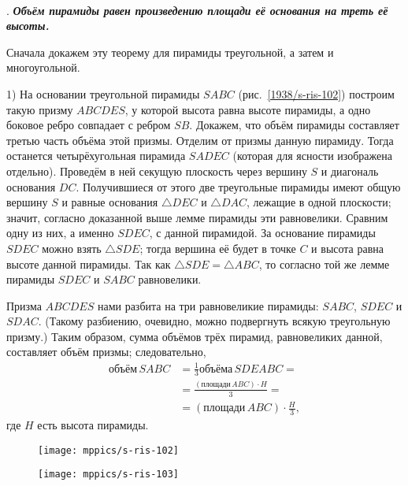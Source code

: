 \paragraph{}\label{1938/s91}
.
\textbf{\emph{Объём пирамиды равен произведению площади её основания на треть её высоты.}}

Сначала докажем эту теорему для пирамиды треугольной, а затем и многоугольной.

1) На основании треугольной пирамиды $SABC$ (рис.~\ref{1938/s-ris-102}) построим такую призму $ABCDES$, у которой высота равна высоте пирамиды, а одно боковое ребро совпадает с ребром $SB$.
Докажем, что объём пирамиды составляет третью часть объёма этой призмы.
Отделим от призмы данную пирамиду.
Тогда останется четырёхугольная пирамида $SADEC$ (которая для ясности изображена отдельно).
Проведём в ней секущую плоскость через вершину $S$ и диагональ основания $DC$.
Получившиеся от этого две треугольные пирамиды имеют общую вершину $S$ и равные основания $\triangle DEC$ и $\triangle DAC$, лежащие в одной плоскости;
значит, согласно доказанной выше лемме пирамиды эти равновелики.
Сравним одну из них, а именно $SDEC$, с данной пирамидой.
За основание пирамиды $SDEC$ можно взять $\triangle SDE$;
тогда вершина её будет в точке $C$ и высота равна высоте данной пирамиды.
Так как $\triangle SDE=\triangle ABC$, то согласно той же лемме пирамиды $SDEC$ и $SABC$ равновелики.

Призма $ABCDES$ нами разбита на три равновеликие пирамиды: $SABC$, $SDEC$ и $SDAC$.
(Такому разбиению, очевидно, можно подвергнуть всякую треугольную призму.) Таким образом, сумма объёмов трёх пирамид, равновеликих данной, составляет объём призмы;
следовательно,
\begin{align*}
\text{объём}\,SABC &= \tfrac13 \text{объёма}\, SDEABC =
\\
&=\frac{(\text{площади}\,ABC)\cdot H}3=
\\
&=(\text{площади}\,ABC)\cdot \frac{H}3,
\end{align*}
где $H$ есть высота пирамиды.


\begin{figure}[!ht]
\begin{minipage}{.58\textwidth}
\centering
\texttt{[image: mppics/s-ris-102]}
\end{minipage}\hfill
\begin{minipage}{.38\textwidth}
\centering
\texttt{[image: mppics/s-ris-103]}
\end{minipage}

\medskip

\begin{minipage}{.58\textwidth}
\centering
\caption{}\label{1938/s-ris-102}
\end{minipage}\hfill
\begin{minipage}{.38\textwidth}
\centering
\caption{}\label{1938/s-ris-103}
\end{minipage}
\vskip-4mm
\end{figure}

